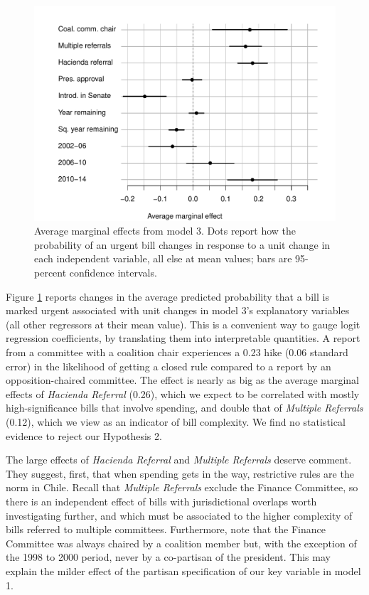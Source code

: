 \documentclass[letter,12pt]{article}
\begin{document}
\begin{figure}
  \centering
    \caption{Average marginal effects from model 3. Dots report how the probability of an urgent bill changes in response to a unit change in each independent variable, all else at mean values; bars are 95-percent confidence intervals.}\label{F:avgMg}
    \includegraphics[width=.8\columnwidth]{../graphs/avgMgEffects.pdf}
\end{figure}

Figure \ref{F:avgMg} reports changes in the average predicted probability that a bill is marked urgent associated with unit changes in model 3's explanatory variables (all other regressors at their mean value). This is a convenient way to gauge logit regression coefficients, by translating them into interpretable quantities. A report from a committee with a coalition chair experiences a 0.23 hike (0.06 standard error) in the likelihood of getting a closed rule compared to a report by an opposition-chaired committee. The effect is nearly as big as the average marginal effects of \emph{Hacienda Referral} (0.26), which we expect to be correlated with mostly high-significance bills that involve spending, and double that of \emph{Multiple Referrals} (0.12), which we view as an indicator of bill complexity. We find no statistical evidence to reject our Hypothesis 2.  

The large effects of \emph{Hacienda Referral} and \emph{Multiple Referrals} deserve comment. They suggest, first, that when spending gets in the way, restrictive rules are the norm in Chile. Recall that \emph{Multiple Referrals} exclude the Finance Committee, so there is an independent effect of bills with jurisdictional overlaps worth investigating further, and which must be associated to the higher complexity of bills referred to multiple committees. Furthermore, note that the Finance Committee was always chaired by a coalition member but, with the exception of the 1998 to 2000 period, never by a co-partisan of the president. This may explain the milder effect of the partisan specification of our key variable in model 1. 
\end{document}
